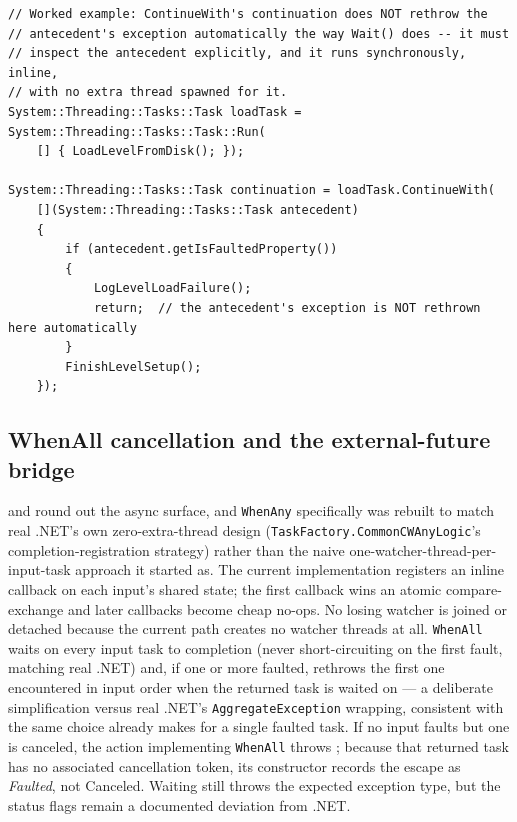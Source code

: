 \begin{lstlisting}
// Worked example: ContinueWith's continuation does NOT rethrow the
// antecedent's exception automatically the way Wait() does -- it must
// inspect the antecedent explicitly, and it runs synchronously, inline,
// with no extra thread spawned for it.
System::Threading::Tasks::Task loadTask = System::Threading::Tasks::Task::Run(
    [] { LoadLevelFromDisk(); });

System::Threading::Tasks::Task continuation = loadTask.ContinueWith(
    [](System::Threading::Tasks::Task antecedent)
    {
        if (antecedent.getIsFaultedProperty())
        {
            LogLevelLoadFailure();
            return;  // the antecedent's exception is NOT rethrown here automatically
        }
        FinishLevelSetup();
    });
\end{lstlisting}

\subsection{WhenAll cancellation and the external-future bridge}

 and  round out the async surface, and
\texttt{WhenAny} specifically was rebuilt to match real .NET's own zero-extra-thread design
(\texttt{TaskFactory.CommonCWAnyLogic}'s completion-registration strategy) rather than the
naive one-watcher-thread-per-input-task approach it started as. The current implementation
registers an inline callback on each input's shared state; the first callback wins an atomic
compare-exchange and later callbacks become cheap no-ops. No losing watcher is joined or
detached because the current path creates no watcher threads at all. \texttt{WhenAll} waits on
every input task to completion
(never short-circuiting on the first fault, matching real .NET) and, if one or more faulted,
rethrows the first one encountered in input order when the returned task is waited on --- a
deliberate simplification versus real .NET's \texttt{AggregateException} wrapping, consistent
with the same choice  already makes for a single faulted task. If no input
faults but one is canceled, the action implementing \texttt{WhenAll} throws
; because that returned task has no associated cancellation
token, its constructor records the escape as \emph{Faulted}, not Canceled. Waiting still throws
the expected exception type, but the status flags remain a documented deviation from .NET.

